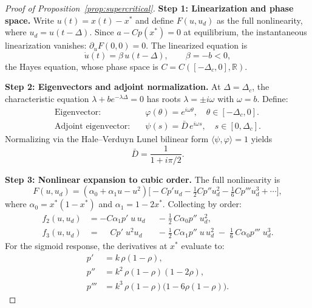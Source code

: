 \begin{proof}[Proof of Proposition~\ref{prop:supercritical}]

\medskip
\noindent\textbf{Step 1: Linearization and phase space.}
Write $u(t)=x(t)-x^*$ and define $F(u,u_d)$ as the full nonlinearity, where $u_d=u(t-\Delta)$. Since $a-Cp(x^*)=0$ at equilibrium, the instantaneous linearization vanishes: $\partial_u F(0,0)=0$. The linearized equation is
\[
\dot{u}(t)=\beta\,u(t-\Delta), \qquad \beta=-b<0,
\]
the Hayes equation, whose phase space is $C=C([-\Delta_c,0],\mathbb{R})$.

\medskip
\noindent\textbf{Step 2: Eigenvectors and adjoint normalization.}
At $\Delta=\Delta_c$, the characteristic equation $\lambda+be^{-\lambda\Delta}=0$ has roots $\lambda=\pm i\omega$ with $\omega=b$. Define:
\begin{align*}
\text{Eigenvector:} \quad & \varphi(\theta)=e^{i\omega\theta}, \quad \theta\in[-\Delta_c,0]. \\
\text{Adjoint eigenvector:} \quad & \psi(s)=\bar{D}\,e^{i\omega s}, \quad s\in[0,\Delta_c].
\end{align*}
Normalizing via the Hale--Verduyn Lunel bilinear form $\langle\psi,\varphi\rangle=1$ yields
\[
\bar{D}=\frac{1}{1+i\pi/2}.
\]

\medskip
\noindent\textbf{Step 3: Nonlinear expansion to cubic order.}
The full nonlinearity is
\[
F(u,u_d) = (\alpha_0 + \alpha_1 u - u^2)\bigl[-Cp'u_d - \tfrac{1}{2}Cp''u_d^2 - \tfrac{1}{6}Cp'''u_d^3 + \cdots\bigr],
\]
where $\alpha_0 = x^*(1{-}x^*)$ and $\alpha_1 = 1{-}2x^*$. Collecting by order:
\begin{equation}
\label{eq:f2f3}
\begin{aligned}
f_2(u,u_d) &= -C\alpha_1 p'\; u\,u_d
              &&-\; \tfrac{1}{2}\,C\alpha_0 p''\; u_d^2, \\[4pt]
f_3(u,u_d) &= \phantom{-}C p'\; u^2 u_d
              &&-\; \tfrac{1}{2}\,C\alpha_1 p''\; u\,u_d^2
              \;-\; \tfrac{1}{6}\,C\alpha_0 p'''\; u_d^3.
\end{aligned}
\end{equation}
For the sigmoid response, the derivatives at $x^*$ evaluate to:
\begin{align}
p'  &= k\,\rho(1-\rho), \nonumber\\
p'' &= k^2\,\rho(1-\rho)(1-2\rho), \label{eq:sigmoid_derivs}\\
p'''&= k^3\,\rho(1-\rho)\bigl(1-6\rho(1-\rho)\bigr). \nonumber
\end{align}


\end{proof}
